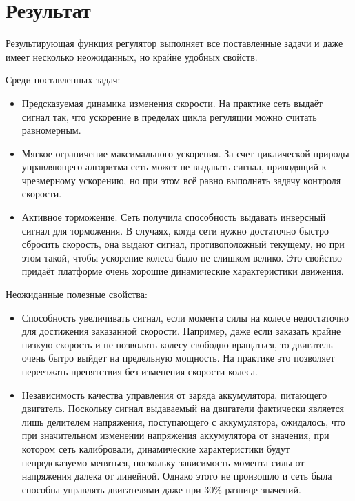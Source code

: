\documentclass[14pt]{extreport}
\begin{document}
        \section{Результат}
            Результирующая функция регулятор выполняет все поставленные задачи и даже имеет несколько неожиданных, но крайне удобных свойств.
            
            Среди поставленных задач:
                \begin{itemize}
                  \item Предсказуемая динамика изменения скорости. На практике сеть выдаёт сигнал так, что ускорение в пределах цикла регуляции можно считать равномерным.
                  \item Мягкое ограничение максимального ускорения. За счет циклической природы управляющего алгоритма сеть может не выдавать сигнал, приводящий к чрезмерному ускорению, но при этом всё равно выполнять задачу контроля скорости.
                  \item Активное торможение. Сеть получила способность выдавать инверсный сигнал для торможения. В случаях, когда сети нужно достаточно быстро сбросить скорость, она выдают сигнал, противоположный текущему, но при этом такой, чтобы ускорение колеса было не слишком велико. Это свойство придаёт платформе очень хорошие динамические характеристики движения.
                \end{itemize}
            Неожиданные полезные свойства:
                \begin{itemize}
                  \item Способность увеличивать сигнал, если момента силы на колесе недостаточно для достижения заказанной скорости. Например, даже если заказать крайне низкую скорость и не позволять колесу свободно вращаться, то двигатель очень бытро выйдет на предельную мощность. На практике это позволяет переезжать препятствия без изменения скорости колеса.
                  \item Независимость качества управления от заряда аккумулятора, питающего двигатель. Поскольку сигнал выдаваемый на двигатели фактически является лишь делителем напряжения, поступающего с аккумулятора, ожидалось, что при значительном изменении напряжения аккумулятора от значения, при котором сеть калибровали, динамические характеристики будут непредсказуемо меняться, поскольку зависимость момента силы от напряжения далека от линейной. Однако этого не произошло и сеть была способна управлять двигателями даже при 30\% разнице значений.
                \end{itemize}
                
\end{document}
